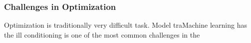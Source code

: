 \subsubsection{Challenges in Optimization}

Optimization is traditionally very difficult task. Model traMachine learning has 
the ill conditioning is one of the most common challenges in the 